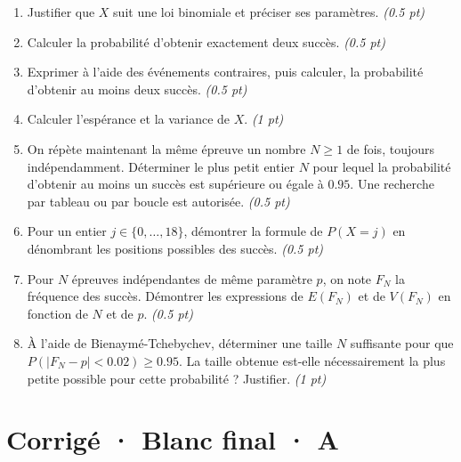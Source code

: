 \begin{enumerate}

\item Justifier que $X$ suit une loi binomiale et préciser ses paramètres. \hfill\textit{(\num{0,5} pt)}

\item Calculer la probabilité d'obtenir exactement deux succès. \hfill\textit{(\num{0,5} pt)}

\item Exprimer à l'aide des événements contraires, puis calculer, la probabilité d'obtenir au moins deux succès. \hfill\textit{(\num{0,5} pt)}

\item Calculer l'espérance et la variance de $X$. \hfill\textit{(1 pt)}

\item On répète maintenant la même épreuve un nombre $N\ge1$ de fois, toujours indépendamment. Déterminer le plus petit entier $N$ pour lequel la probabilité d'obtenir au moins un succès est supérieure ou égale à $\num{0,95}$. Une recherche par tableau ou par boucle est autorisée. \hfill\textit{(\num{0,5} pt)}

\item Pour un entier $j\in\{0,\ldots,18\}$, démontrer la formule de $P(X=j)$ en dénombrant les positions possibles des succès. \hfill\textit{(\num{0,5} pt)}

\item Pour $N$ épreuves indépendantes de même paramètre $p$, on note $F_N$ la fréquence des succès. Démontrer les expressions de $E(F_N)$ et de $V(F_N)$ en fonction de $N$ et de $p$. \hfill\textit{(\num{0,5} pt)}

\item À l'aide de Bienaymé-Tchebychev, déterminer une taille $N$ suffisante pour que $P(|F_N-p|<\num{0,02})\ge\num{0,95}$. La taille obtenue est-elle nécessairement la plus petite possible pour cette probabilité ? Justifier. \hfill\textit{(1 pt)}

\end{enumerate}

\ifmxteacher\mxnewpage

\section*{Corrigé · Blanc final · A}\label{cor:9-3}

